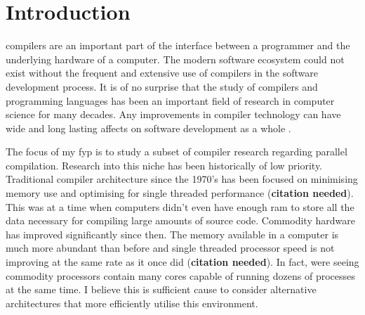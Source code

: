 \chapter{Introduction} \label{introduction}

\Glspl{compiler} are an important part of the interface between a programmer
and the underlying hardware of a computer. The modern software ecosystem
could not exist without the frequent and extensive use of compilers in
the software development process. It is of no surprise that the study of
compilers and programming languages has been an important field of research
in computer science for many decades. Any improvements in compiler technology
can have wide and long lasting affects on software development as a whole
\citep{hall_compiler_2009}.

The focus of my \ac{fyp} is to study a subset of compiler research regarding
parallel compilation. Research into this niche has been historically of low
priority. Traditional compiler architecture since the 1970’s has been focused
on minimising memory use and optimising for single threaded performance
(\textbf{citation needed}). This was at a time when computers didn’t even have
enough \ac{ram} to store all the data necessary for compiling large amounts
of source code. Commodity hardware has improved significantly since then. The
memory available in a computer is much more abundant than before and single
threaded processor speed is not improving at the same rate as it once did
(\textbf{citation needed}). In fact, were seeing commodity processors contain
many cores capable of running dozens of processes at the same time. I believe
this is sufficient cause to consider alternative architectures that more
efficiently utilise this environment.

